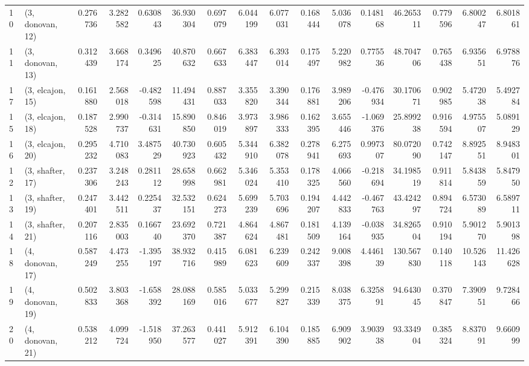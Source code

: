 \begin{tabular}{llrrrrrrrrrrrrrr}
10 &  (3, donovan, 12) &   0.276736 &  3.282582 &  0.630843 &   36.930304 &  0.697079 &   6.044199 &   6.077031 &  0.168444 &  5.036078 &  0.148168 &   46.265311 &  0.779596 &   6.800247 &   6.801861 \\
11 &  (3, donovan, 13) &   0.312439 &  3.668174 &  0.349625 &   40.870632 &  0.667633 &   6.383447 &   6.393014 &  0.175497 &  5.220982 &  0.775536 &   48.704706 &  0.765438 &   6.935651 &   6.978876 \\
17 &  (3, elcajon, 15) &   0.161880 &  2.568018 & -0.482598 &   11.494431 &  0.887033 &   3.355820 &   3.390344 &  0.176881 &  3.989206 & -0.476934 &   30.170671 &  0.902985 &   5.472038 &   5.492784 \\
15 &  (3, elcajon, 18) &   0.187528 &  2.990737 & -0.314631 &   15.890850 &  0.846019 &   3.973897 &   3.986333 &  0.162395 &  3.655446 & -1.069376 &   25.899238 &  0.916594 &   4.975507 &   5.089129 \\
16 &  (3, elcajon, 20) &   0.295232 &  4.710083 &  3.487529 &   40.730923 &  0.605432 &   5.344910 &   6.382078 &  0.278941 &  6.275693 &  0.997307 &   80.072090 &  0.742147 &   8.892551 &   8.948301 \\
12 &  (3, shafter, 17) &   0.237306 &  3.248243 &  0.281112 &   28.658998 &  0.662981 &   5.346024 &   5.353410 &  0.178325 &  4.066560 & -0.218694 &   34.198519 &  0.911814 &   5.843859 &   5.847950 \\
13 &  (3, shafter, 19) &   0.247401 &  3.442511 &  0.225437 &   32.532151 &  0.624273 &   5.699239 &   5.703696 &  0.194207 &  4.442833 & -0.467763 &   43.424297 &  0.894724 &   6.573089 &   6.589711 \\
14 &  (3, shafter, 21) &   0.207116 &  2.835003 &  0.166740 &   23.692370 &  0.721387 &   4.864624 &   4.867481 &  0.181509 &  4.139164 & -0.038935 &   34.826504 &  0.910194 &   5.901270 &   5.901398 \\
18 &  (4, donovan, 17) &   0.587249 &  4.473255 & -1.395197 &   38.932716 &  0.415989 &   6.081623 &   6.239609 &  0.242337 &  9.008398 &  4.446139 &  130.567830 &  0.140118 &  10.526143 &  11.426628 \\
19 &  (4, donovan, 19) &   0.502833 &  3.803368 & -1.658392 &   28.088169 &  0.585016 &   5.033677 &   5.299827 &  0.215339 &  8.038375 &  6.325891 &   94.643045 &  0.370847 &   7.390951 &   9.728466 \\
20 &  (4, donovan, 21) &   0.538212 &  4.099724 & -1.518950 &   37.263577 &  0.441027 &   5.912391 &   6.104390 &  0.185885 &  6.909902 &  3.903938 &   93.334904 &  0.385324 &   8.837091 &   9.660999 \\

\end{tabular}
